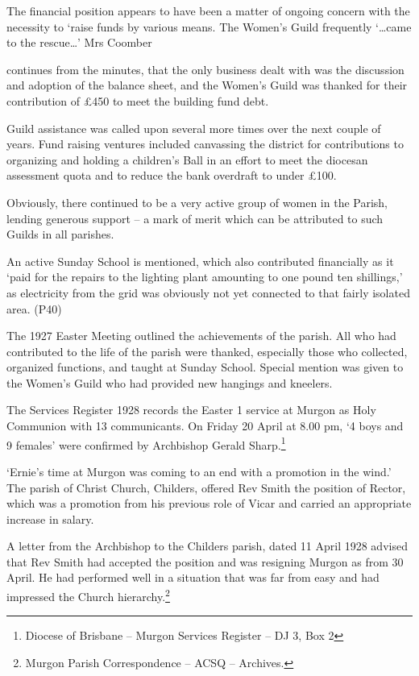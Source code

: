 The financial position appears to have been a matter of ongoing concern with the necessity to `raise funds by various means. The Women's Guild frequently `\ldots came to the rescue\ldots' Mrs Coomber

continues from the minutes, that the only business dealt with was the discussion and adoption of the balance sheet, and the Women's Guild was thanked for their contribution of £450 to meet the building fund debt.

Guild assistance was called upon several more times over the next couple of years. Fund raising ventures included canvassing the district for contributions to organizing and holding a children's Ball in an effort to meet the diocesan assessment quota and to reduce the bank overdraft to under £100.

Obviously, there continued to be a very active group of women in the Parish, lending generous support -- a mark of merit which can be attributed to such Guilds in all parishes.

An active Sunday School is mentioned, which also contributed financially as it `paid for the repairs to the lighting plant amounting to one pound ten shillings,' as electricity from the grid was obviously not yet connected to that fairly isolated area. (P40)

The 1927 Easter Meeting outlined the achievements of the parish. All who had contributed to the life of the parish were thanked, especially those who collected, organized functions, and taught at Sunday School. Special mention was given to the Women's Guild who had provided new hangings and kneelers.

The Services Register 1928 records the Easter 1 service at Murgon as Holy Communion with 13 communicants. On Friday 20 April at 8.00 pm, `4 boys and 9 females' were confirmed by Archbishop Gerald Sharp.\footnote{Diocese of Brisbane -- Murgon Services Register -- DJ 3, Box 2}

`Ernie's time at Murgon was coming to an end with a promotion in the wind.' The parish of Christ Church, Childers, offered Rev Smith the position of Rector, which was a promotion from his previous role of Vicar and carried an appropriate increase in salary.

A letter from the Archbishop to the Childers parish, dated 11 April 1928 advised that Rev Smith had accepted the position and was resigning Murgon as from 30 April. He had performed well in a situation that was far from easy and had impressed the Church hierarchy.\footnote{Murgon Parish Correspondence -- ACSQ -- Archives.}

